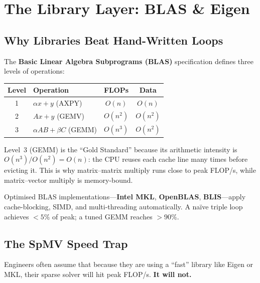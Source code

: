 \section{The Library Layer: BLAS \& Eigen}
\label{sec:blas}

\subsection{Why Libraries Beat Hand-Written Loops}

The \textbf{Basic Linear Algebra Subprograms (BLAS)} specification defines
three levels of operations:

\begin{center}
\renewcommand{\arraystretch}{1.3}
\begin{tabular}{@{}clcc@{}}
\toprule
\textbf{Level} & \textbf{Operation} & \textbf{FLOPs} & \textbf{Data} \\
\midrule
1 & $\alpha x + y$ \quad (AXPY)       & $O(n)$   & $O(n)$ \\
2 & $Ax + y$ \quad (GEMV)             & $O(n^2)$ & $O(n^2)$ \\
3 & $\alpha AB + \beta C$ \quad (GEMM) & $O(n^3)$ & $O(n^2)$ \\
\bottomrule
\end{tabular}
\end{center}

\begin{tipbox}
Level~3 (GEMM) is the ``Gold Standard'' because its arithmetic intensity
is $O(n^3)/O(n^2) = O(n)$: the CPU reuses each cache line many times before
evicting it.  This is why matrix--matrix multiply runs close to peak FLOP/s,
while matrix--vector multiply is memory-bound.
\end{tipbox}

Optimised BLAS implementations---\textbf{Intel MKL}, \textbf{OpenBLAS},
\textbf{BLIS}---apply cache-blocking, SIMD, and multi-threading
automatically.  A na\"ive triple loop achieves $<5\%$ of peak;
a tuned GEMM reaches $>90\%$.

\subsection{The SpMV Speed Trap}

Engineers often assume that because they are using a ``fast'' library like
Eigen or MKL, their sparse solver will hit peak FLOP/s.
\textbf{It will not.}

